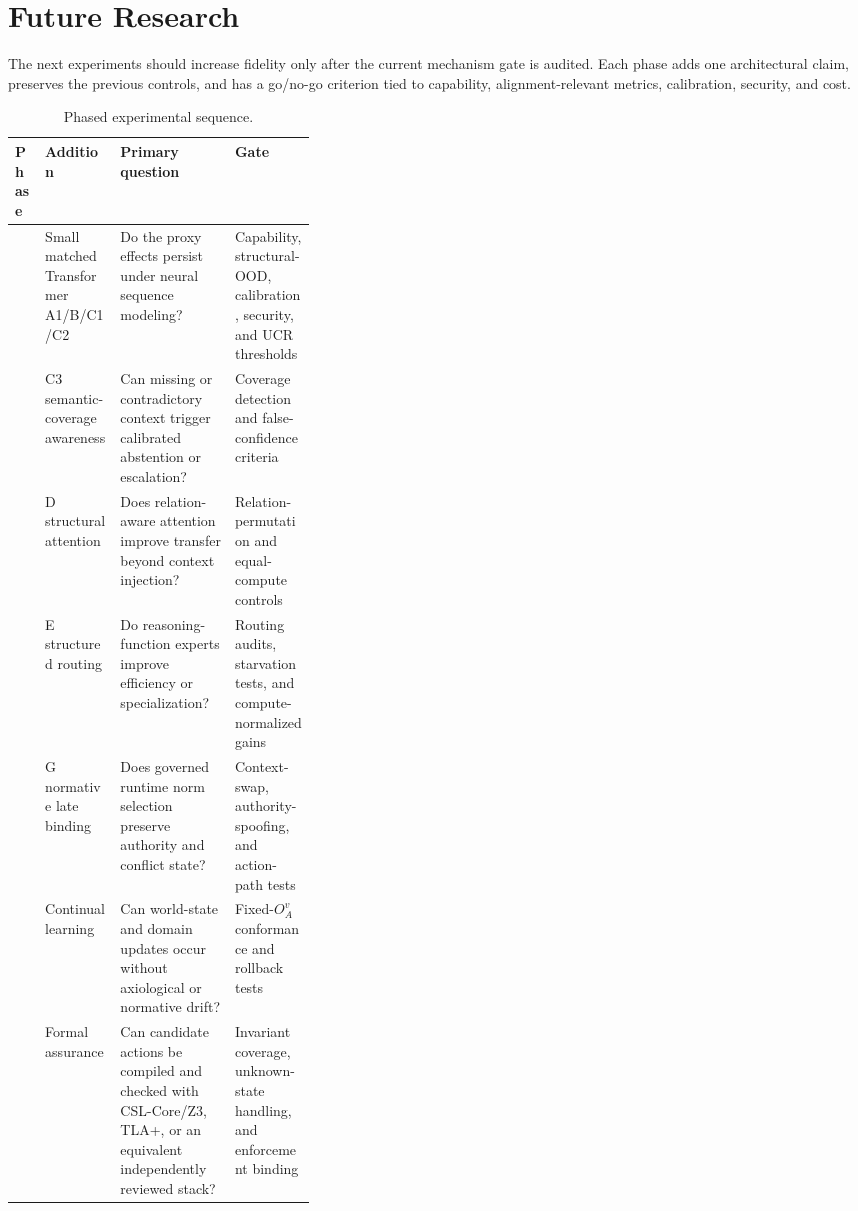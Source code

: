 \section{Future Research}
\label{sec:future}

The next experiments should increase fidelity only after the current mechanism gate is audited. Each phase adds one architectural claim, preserves the previous controls, and has a go/no-go criterion tied to capability, alignment-relevant metrics, calibration, security, and cost.

\begin{table}[t]
\centering
\scriptsize
\caption{Phased experimental sequence.}
\label{tab:future-phases}
\renewcommand{\arraystretch}{1.12}
\begin{tabularx}{\linewidth}{@{}>{\raggedright\arraybackslash}p{0.10\linewidth}>{\raggedright\arraybackslash}p{0.25\linewidth}>{\raggedright\arraybackslash}X>{\raggedright\arraybackslash}X@{}}
\toprule
Phase & Addition & Primary question & Gate \\
\midrule
1 & Small matched Transformer A1/B/C1/C2 & Do the proxy effects persist under neural sequence modeling? & Capability, structural-OOD, calibration, security, and UCR thresholds \\
2 & C3 semantic-coverage awareness & Can missing or contradictory context trigger calibrated abstention or escalation? & Coverage detection and false-confidence criteria \\
3 & D structural attention & Does relation-aware attention improve transfer beyond context injection? & Relation-permutation and equal-compute controls \\
4 & E structured routing & Do reasoning-function experts improve efficiency or specialization? & Routing audits, starvation tests, and compute-normalized gains \\
5 & G normative late binding & Does governed runtime norm selection preserve authority and conflict state? & Context-swap, authority-spoofing, and action-path tests \\
6 & Continual learning & Can world-state and domain updates occur without axiological or normative drift? & Fixed-$O_A^v$ conformance and rollback tests \\
7 & Formal assurance & Can candidate actions be compiled and checked with CSL-Core/Z3, TLA+, or an equivalent independently reviewed stack? & Invariant coverage, unknown-state handling, and enforcement binding \\
\bottomrule
\end{tabularx}
\end{table}

